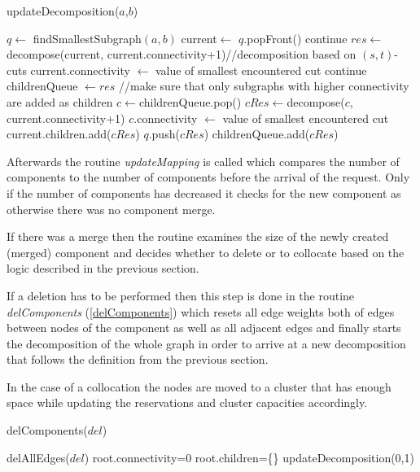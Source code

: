 \documentclass[a4paper, 10pt]{article}
\theoremstyle{definition}
\begin{document}
\begin{algorithm}
	\caption{updateDecomposition($a$,$b$)}
	\label{updateDecomposition}
	\begin{algorithmic}
		\STATE $q\leftarrow$ findSmallestSubgraph$(a,b)$
		\STATE current$\leftarrow$ $q$.popFront()
		\STATE continue
		\ENDIF
		\STATE $res\leftarrow$ decompose(current, current.connectivity+1)//decomposition based on $(s,t)$-cuts
		\STATE current.connectivity $\leftarrow$ value of smallest encountered cut
		\STATE continue
		\ENDIF
		\STATE childrenQueue $\leftarrow res$
		\STATE //make sure that only subgraphs with higher connectivity are added as children
		\STATE $c\leftarrow$childrenQueue.pop()
		\STATE $cRes\leftarrow$decompose($c$, current.connectivity+1)
		\STATE $c$.connectivity $\leftarrow$ value of smallest encountered cut
		\STATE current.children.add($cRes$)
		\STATE $q$.push($cRes$)
		\ENDIF
		\ELSE
		\STATE childrenQueue.add($cRes$)
		\ENDIF
		\ENDWHILE
		\ENDWHILE
	\end{algorithmic}		
\end{algorithm}

Afterwards the routine \textit{updateMapping} is called which compares the number of components to the number of components before the arrival of the request. Only if the number of components has decreased it checks for the new component as otherwise there was no component merge. 

If there was a merge then the routine examines the size of the newly created (merged) component and decides whether to delete or to collocate based on the logic described in the previous section.

If a deletion has to be performed then this step is done in the routine \textit{delComponents} (\cref{delComponents}) which resets all edge weights both of edges between nodes of the component as well as all adjacent edges and finally starts the decomposition of the whole graph in order to arrive at a new decomposition that follows the definition from the previous section.

In the case of a collocation the nodes are moved to a cluster that has enough space while updating the reservations and cluster capacities accordingly.



\begin{algorithm}
	\caption{delComponents($del$)}
	\label{delComponents}
	\begin{algorithmic}
		\STATE delAllEdges($del$)
		\STATE root.connectivity=0
		\STATE root.children=\{\}
		\STATE updateDecomposition(0,1)
	\end{algorithmic}
\end{algorithm}
\end{document}
